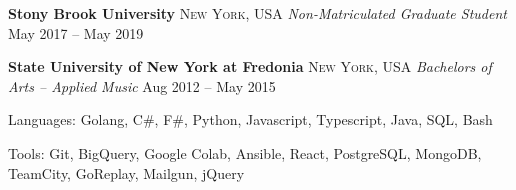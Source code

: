 \documentclass[10pt,letterpaper]{article}
\begin{document}

\headedsection
{\textbf{Stony Brook University}}
{\textsc{New York, USA}} {
	\headedsubsection
	{\textit{Non-Matriculated Graduate Student}}
	{May 2017 -- May 2019}
	{\bodytext{}}
}
\vspace{-5mm}


\headedsection
{\textbf{State University of New York at Fredonia}}
{\textsc{New York, USA}} {
	\headedsubsection
	{\textit{Bachelors of Arts -- Applied Music}}
	{Aug 2012 -- May 2015}
	{\bodytext{}}
}
\vspace{-5mm}


\spacedhrule{-0.6em}{-0.7em}








\inlineheadsection
{Languages:}
{Golang, C\#, F\#, Python, Javascript, Typescript, Java, SQL, Bash}
\vspace{0.5em}


\inlineheadsection
{Tools:}
{Git, BigQuery, Google Colab, Ansible, React, PostgreSQL, MongoDB, TeamCity, GoReplay, Mailgun, jQuery}
\vspace{0.5em}


\spacedhrule{1em}{-1em}






\end{document}
